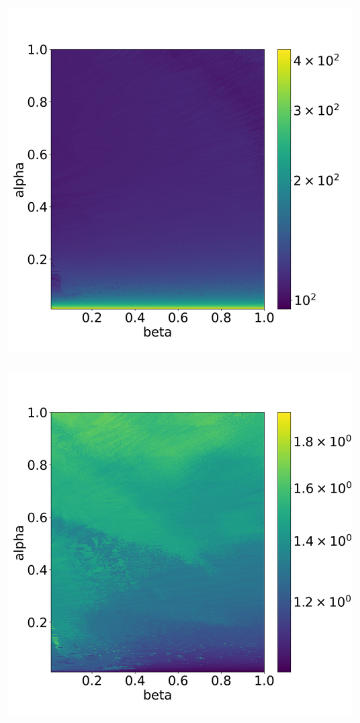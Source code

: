 \documentclass{report}
\begin{document}
\begin{figure}[H]
    \centering
    \begin{subfigure}{0.32\textwidth}
    	\centering
    	\includegraphics[width=1\textwidth]{images/analysis_RKF45_TS.png}
        \label{fig:numberTimeStepsRKF45}
    \end{subfigure}
    \begin{subfigure}{0.32\textwidth}
    	\centering
    	\includegraphics[width=1\textwidth]{images/analysis_RKF45_NI.png}

\end{subfigure}
\end{figure}
\end{document}
